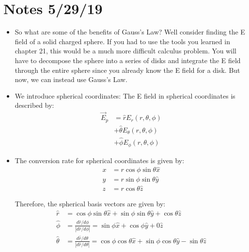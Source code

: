 \documentclass[12pt]{extreport}
\begin{document}
\section{Notes 5/29/19}
	\begin{itemize}
		\item So what are some of the benefits of Gauss's Law?
		Well consider finding the E field of a solid charged sphere. If you had to use the tools you learned in chapter 21, this would be a much more difficult calculus problem. You will have to decompose the sphere into a series of disks and integrate the E field through the entire sphere since you already know the E field for a disk. But now, we can instead use Gauss's Law.

		\item We introduce spherical coordinates: The E field in spherical coordinates is described by:
		\begin{align*}
			\vec E_p &= \hat r E_r(r, \theta, \phi) \\
				     &+ \hat \theta E_\theta(r, \theta, \phi) \\
				     &+ \hat \phi E_\phi(r, \theta, \phi)
		\end{align*}

		\item The conversion rate for spherical coordinates is given by:
		\begin{align*}
			x &= r \cos \phi \sin \theta \hat x \\
			y &= r \sin \phi \sin \theta \hat y \\
			z &= r \cos \theta \hat z
		\end{align*}

		Therefore, the spherical basis vectors are given by: 
		\begin{align*}
			\hat r &= \cos \phi \sin \theta \hat x + \sin \phi \sin \theta \hat y + \cos \theta \hat z \\
			\hat \phi &= \frac{d \hat r/d\phi}{|d \hat r/d\phi|} = \sin \phi \hat x + \cos \phi \hat y + 0 \hat z \\
			\hat \theta &= \frac{d \hat r/d\theta}{|d \hat r/d\theta|} = \cos \phi \cos \theta \hat x + \sin \phi \cos \theta \hat y - \sin \theta \hat z
		\end{align*}


\end{itemize}
\end{document}
